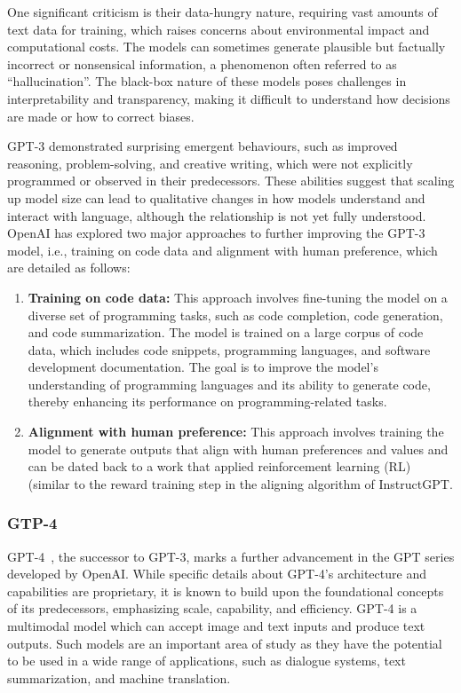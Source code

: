 One significant criticism is their data-hungry nature, requiring vast amounts of text data for training, which raises concerns about environmental impact and computational costs.
The models can sometimes generate plausible but factually incorrect or nonsensical information, a phenomenon often referred to as \enquote{hallucination}.
The black-box nature of these models poses challenges in interpretability and transparency, making it difficult to understand how decisions are made or how to correct biases.

GPT-3 demonstrated surprising emergent behaviours, such as improved reasoning, problem-solving, and creative writing, which were not explicitly programmed or observed in their predecessors.
These abilities suggest that scaling up model size can lead to qualitative changes in how models understand and interact with language, although the relationship is not yet fully understood.
OpenAI has explored two major approaches to further improving the GPT-3 model, i.e., training on code data and alignment with human preference, which are detailed as follows:
\begin{enumerate}
	\item \textbf{Training on code data:} {
		      This approach involves fine-tuning the model on a diverse set of programming tasks, such as code completion, code generation, and code summarization.
		      The model is trained on a large corpus of code data, which includes code snippets, programming languages, and software development documentation.
		      The goal is to improve the model's understanding of programming languages and its ability to generate code, thereby enhancing its performance on programming-related tasks.
	      }
	\item \textbf{Alignment with human preference:} {
	      This approach involves training the model to generate outputs that align with human preferences and values and can be dated back to a work that applied reinforcement learning (RL) \textcite{christiano2017deep} (similar to the reward training step in the aligning algorithm of InstructGPT.
	      }
\end{enumerate}

\subsubsection{GTP-4}
\label{subsubsec:gpt-4}

GPT-4~\cite{openai2024gpt4}, the successor to GPT-3, marks a further advancement in the GPT series developed by OpenAI. While specific details about GPT-4's architecture and capabilities are proprietary, it is known to build upon the foundational concepts of its predecessors, emphasizing scale, capability, and efficiency.
GPT-4 is a multimodal model which can accept image and text inputs and produce text outputs.
Such models are an important area of study as they have the potential to be used in a wide range of applications, such as dialogue systems, text summarization, and machine translation.

